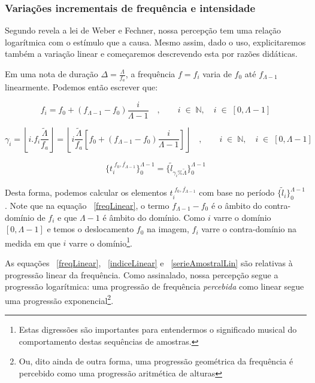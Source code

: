 \subsubsection{Variações incrementais de frequência e intensidade}

Segundo revela a lei de Weber e Fechner, nossa percepção tem uma relação logarítmica com
o estímulo que a causa. Mesmo assim, dado o uso, explicitaremos também a variação
linear e começaremos descrevendo esta por razões didáticas.

Em uma nota de duração $\Delta = \frac{\Lambda}{f_a}$, a frequência $f=f_i$ varia de $f_0$ até $f_{\Lambda -1}$
linearmente. Podemos então escrever que:

\begin{equation}\label{freqLinear}
f_i=f_0 + (f_{\Lambda-1}-f_0)\frac{i}{\Lambda-1} \quad ,\quad \quad i \;\in\; \mathbb{N}, \quad i \;\in\; [0,\Lambda-1]
\end{equation}

\begin{equation}\label{indiceLinear}
\gamma_i=\left \lfloor i . f_i\frac{\widetilde{\Lambda}}{f_a} \right \rfloor   =\left \lfloor i  \frac{\widetilde{\Lambda}}{f_a} \left [f_0 + (f_{\Lambda-1}-f_0)\frac{i}{\Lambda-1} \right ] \right \rfloor   \quad ,\quad \quad i \;\in\; \mathbb{N}, \quad i \;\in\; [0,\Lambda-1]
\end{equation}

\begin{equation}\label{serieAmostralLin}
\{t_i^{\;\overline{f_0,f_{\Lambda-1}}}\}_0^{\Lambda-1}=\{\widetilde{l}_{\gamma_i \% \widetilde{\Lambda}}\}_0^{\Lambda-1}
\end{equation}

Desta forma, podemos calcular os elementos $t_i^{\;\overline{f_0,f_{\Lambda-1}}}$
com base no período $\{\widetilde{l}_i\}_0^{\Lambda-1}$. Note que na equação
~\ref{freqLinear}, o termo $f_{\Lambda -1} - f_0$ é o âmbito do contra-domínio de $f_i$
e que $\Lambda -1$ é âmbito do domínio. Como $i$ varre o domínio $[0,\Lambda-1]$ e
temos o deslocamento $f_0$ na imagem, $f_i$ varre o contra-domínio 
na medida em que $i$ varre o domínio\footnote{Estas digressões são importantes
para entendermos o significado musical do comportamento destas sequências de amostras.}.

As equações ~\ref{freqLinear}, ~\ref{indiceLinear} e ~\ref{serieAmostralLin} são relativas à progressão linear
da frequência. Como assinalado, nossa percepção segue a progressão logarítmica:
uma progressão de frequência
\emph{percebida} como linear segue uma progressão exponencial\footnote{Ou,
dito ainda de outra forma, uma progressão geométrica da frequência
é percebido como uma progressão aritmética de alturas}.

